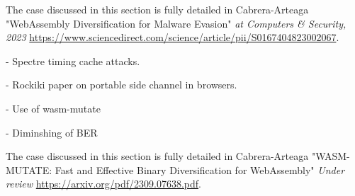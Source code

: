 



\begin{tcolorbox}[title=Contribution paper,boxrule=1pt,arc=.2em,boxsep=1.0mm]
    The case discussed in this section is fully detailed in Cabrera-Arteaga \etal "WebAssembly Diversification for Malware Evasion"
    \emph{at Computers \& Security, 2023}
    \url{https://www.sciencedirect.com/science/article/pii/S0167404823002067}. 
\end{tcolorbox}






- Spectre timing cache attacks.

- Rockiki paper on portable side channel in browsers.



- Use of wasm-mutate


- Diminshing of BER


\begin{tcolorbox}[title=Contribution paper,boxrule=1pt,arc=.2em,boxsep=1.0mm]
    The case discussed in this section is fully detailed in Cabrera-Arteaga \etal "WASM-MUTATE: Fast and Effective Binary Diversification for WebAssembly"
    \emph{Under review}
    \url{https://arxiv.org/pdf/2309.07638.pdf}. 
\end{tcolorbox}



